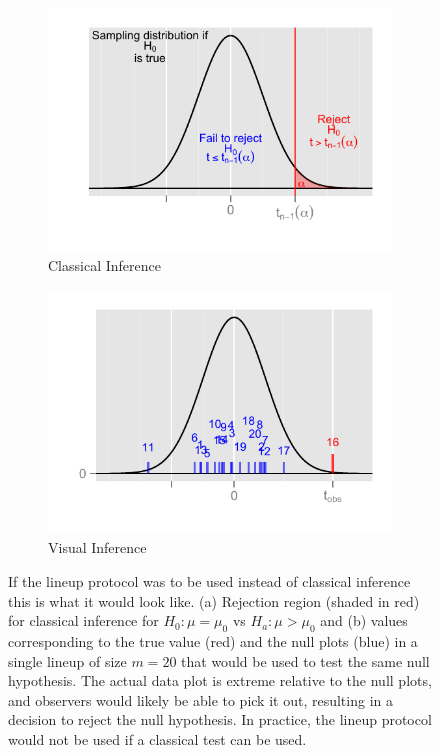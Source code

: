 \documentclass[12pt]{article}\usepackage[]{graphicx}\usepackage[]{color}
\begin{document}
\begin{figure}[!t]
\centering
\begin{subfigure}[t]{0.49\textwidth}
  \caption{Classical Inference}
\vspace{-.1in}
  \includegraphics[width=\textwidth]{diagram.pdf}
\end{subfigure}
\begin{subfigure}[t]{0.49\textwidth}
  \caption{Visual Inference}
\vspace{-.1in}
  \includegraphics[width=\textwidth]{visual-inference-plot-1.pdf}
\end{subfigure}
\vspace{-.2in}
\caption{If the lineup protocol was to be used instead of classical inference this is what it would look like. (a) Rejection region (shaded in red) for classical inference for $H_0: \mu=\mu_0$ vs $H_a:\mu>\mu_0$  and (b) values corresponding to the true value (red) and the null plots (blue) in a single lineup of size $m=20$ that would be used to test the same null hypothesis.  The actual  data plot is extreme relative to the null plots, and observers would likely be able to pick it out, resulting in a decision to reject the null hypothesis. In practice, the lineup protocol would not be used if a classical test can be used. } 
\label{compare}
\end{figure}
\end{document}
